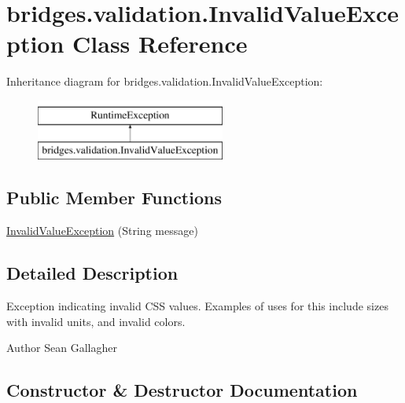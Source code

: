 \hypertarget{classbridges_1_1validation_1_1_invalid_value_exception}{}\section{bridges.\+validation.\+Invalid\+Value\+Exception Class Reference}
\label{classbridges_1_1validation_1_1_invalid_value_exception}
Inheritance diagram for bridges.\+validation.\+Invalid\+Value\+Exception\+:\begin{figure}[H]
\begin{center}
\leavevmode
\includegraphics[height=2.000000cm]{classbridges_1_1validation_1_1_invalid_value_exception}
\end{center}
\end{figure}
\subsection*{Public Member Functions}
\begin{DoxyCompactItemize}
\item 
\mbox{\hyperlink{classbridges_1_1validation_1_1_invalid_value_exception_adf4c16bcef674454b87d8cc035efc75d}{Invalid\+Value\+Exception}} (String message)
\end{DoxyCompactItemize}


\subsection{Detailed Description}
Exception indicating invalid C\+SS values. Examples of uses for this include sizes with invalid units, and invalid colors. \begin{DoxyAuthor}{Author}
Sean Gallagher 
\end{DoxyAuthor}


\subsection{Constructor \& Destructor Documentation}
\mbox{\label{classbridges_1_1validation_1_1_invalid_value_exception_adf4c16bcef674454b87d8cc035efc75d}} 
